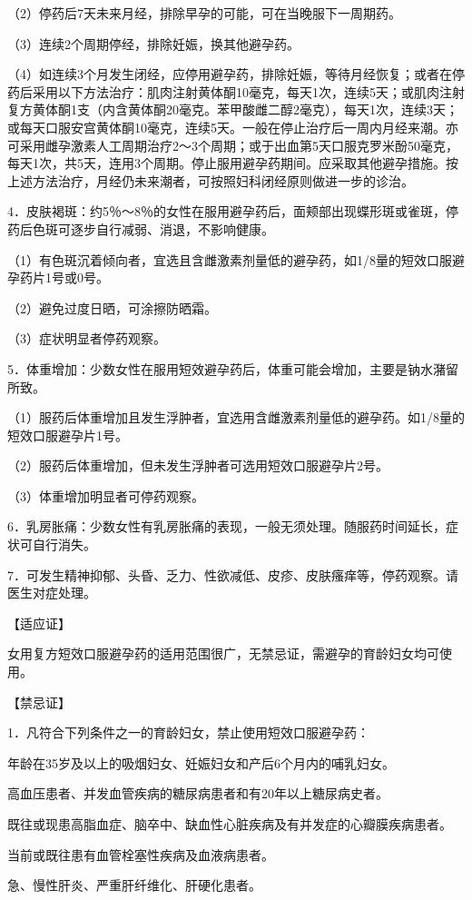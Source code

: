 \documentclass[12pt,UTF8,openany]{ctexbook}
\begin{document}
（2）停药后7天未来月经，排除早孕的可能，可在当晚服下一周期药。

（3）连续2个周期停经，排除妊娠，换其他避孕药。

（4）如连续3个月发生闭经，应停用避孕药，排除妊娠，等待月经恢复；或者在停药后采用以下方法治疗：肌肉注射黄体酮10毫克，每天1次，连续5天；或肌肉注射复方黄体酮1支（内含黄体酮20毫克。苯甲酸雌二醇2毫克），每天1次，连续3天；或每天口服安宫黄体酮10毫克，连续5天。一般在停止治疗后一周内月经来潮。亦可采用雌孕激素人工周期治疗2～3个周期；或于出血第5天口服克罗米酚50毫克，每天1次，共5天，连用3个周期。停止服用避孕药期间。应采取其他避孕措施。按上述方法治疗，月经仍未来潮者，可按照妇科闭经原则做进一步的诊治。

4．皮肤褐斑：约5％～8％的女性在服用避孕药后，面颊部出现蝶形斑或雀斑，停药后色斑可逐步自行减弱、消退，不影响健康。

（1）有色斑沉着倾向者，宜选且含雌激素剂量低的避孕药，如1/8量的短效口服避孕药片1号或0号。

（2）避免过度日晒，可涂擦防晒霜。

（3）症状明显者停药观察。

5．体重增加：少数女性在服用短效避孕药后，体重可能会增加，主要是钠水潴留所致。

（1）服药后体重增加且发生浮肿者，宜选用含雌激素剂量低的避孕药。如1/8量的短效口服避孕片1号。

（2）服药后体重增加，但未发生浮肿者可选用短效口服避孕片2号。

（3）体重增加明显者可停药观察。

6．乳房胀痛：少数女性有乳房胀痛的表现，一般无须处理。随服药时间延长，症状可自行消失。

7．可发生精神抑郁、头昏、乏力、性欲减低、皮疹、皮肤瘙痒等，停药观察。请医生对症处理。

【适应证】

女用复方短效口服避孕药的适用范围很广，无禁忌证，需避孕的育龄妇女均可使用。

【禁忌证】

1．凡符合下列条件之一的育龄妇女，禁止使用短效口服避孕药：

年龄在35岁及以上的吸烟妇女、妊娠妇女和产后6个月内的哺乳妇女。

高血压患者、并发血管疾病的糖尿病患者和有20年以上糖尿病史者。

既往或现患高脂血症、脑卒中、缺血性心脏疾病及有并发症的心瓣膜疾病患者。

当前或既往患有血管栓塞性疾病及血液病患者。

急、慢性肝炎、严重肝纤维化、肝硬化患者。
\end{document}
